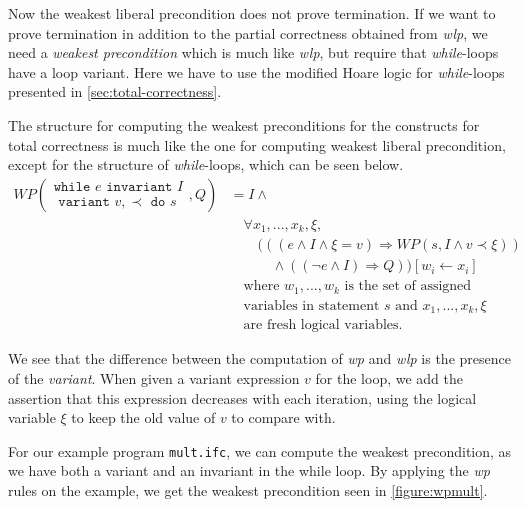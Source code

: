 Now the weakest liberal precondition does not prove termination. If we want to prove termination in addition to the partial correctness obtained from \textit{wlp}, we need a \textit{weakest precondition} which is much like \textit{wlp}, but require that \textit{while}-loops have a loop variant. 
Here we have to use the modified Hoare logic for \textit{while}-loops presented in \ref{sec:total-correctness}.

The structure for computing the weakest preconditions for the constructs for total correctness is much like the one for computing weakest liberal precondition, except for the structure of \textit{while}-loops, which can be seen below.
\begin{equation}\label{eq:wpwhile}
\begin{align*}
	WP\left(
     \begin{array}{c}
     \texttt{while } e \texttt{ invariant } I \\
     \texttt{ variant } v, \prec \texttt{ do } s
     \end{array}
    , Q \right) 
    &= 
		I \land \label{eq:wpwhile} \\
    &\quad \forall x_1, ..., x_k, \xi, \\
    &\quad \quad (((e \land I \land \xi = v) \Rightarrow WP(s, I \land v \prec \xi)) \\
    &\quad \quad \quad \land ((\neg e \land I) \Rightarrow Q)) [w_i \leftarrow x_i] \\
	&\quad \text{where } w_1, ..., w_k \text{ is the set of assigned} \\
	&\quad \text{variables in statement } s \text{ and } x_1, ..., x_k, \xi \\
	&\quad \text{are fresh logical variables.}
\end{align*}
\end{equation}

We see that the difference between the computation of \textit{wp} and \textit{wlp} is the presence of the \textit{variant}. When given a variant expression $v$ for the loop, we add the assertion that this expression decreases with each iteration, using the logical variable $\xi$ to keep the old value of $v$ to compare with.

For our example program \texttt{mult.ifc}, we can compute the weakest precondition, as we have both a variant and an invariant in the while loop.
By applying the \textit{wp} rules on the example, we get the weakest precondition seen in \cref{figure:wpmult}.

